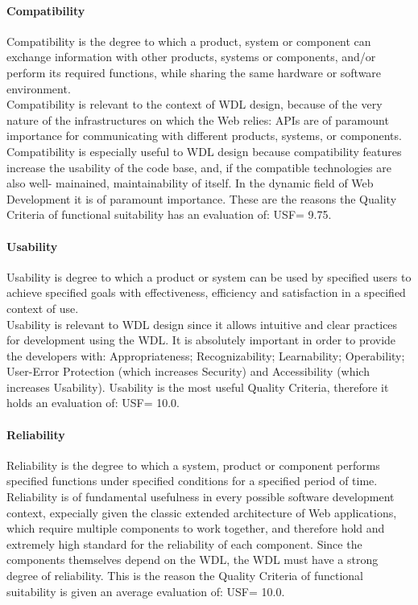 \documentclass{article}
\begin{document}
\paragraph*{Compatibility}
Compatibility is the degree to which a product, system or component can exchange information with other products, systems or components, and/or perform its required functions, while sharing the same hardware or software environment.\\
Compatibility is relevant to the context of WDL design, because of the very nature of the infrastructures on which the Web relies: APIs are of paramount importance for communicating with different products, systems, or components.
Compatibility is especially useful to WDL design because compatibility features increase the usability of the code base, and, if the compatible technologies are also well- mainained, maintainability of itself.
In the dynamic field of Web Development it is of paramount importance.
These are the reasons the Quality Criteria of functional suitability has an evaluation of: USF= 9.75.

\paragraph*{Usability}
Usability is degree to which a product or system can be used by specified users to achieve specified goals with effectiveness, efficiency and satisfaction in a specified context of use.\\
Usability is relevant to WDL design since it allows intuitive and clear practices for development using the WDL.
It is absolutely important in order to provide the developers with: Appropriateness; Recognizability; Learnability; Operability; User-Error Protection (which increases Security) and Accessibility (which increases Usability).
Usability is the most useful Quality Criteria, therefore it holds an evaluation of: USF= 10.0.


\paragraph*{Reliability}  
Reliability is the degree to which a system, product or component performs specified functions under specified conditions for a specified period of time.\\
Reliability is of fundamental usefulness in every possible software development context, expecially given the classic extended architecture of Web applications, which require multiple components to work together, and therefore hold and extremely high standard for the reliability of each component. Since the components themselves depend on the WDL, the WDL must have a strong degree of reliability.
This is the reason the Quality Criteria of functional suitability is given an average evaluation of: USF= 10.0.
\end{document}
